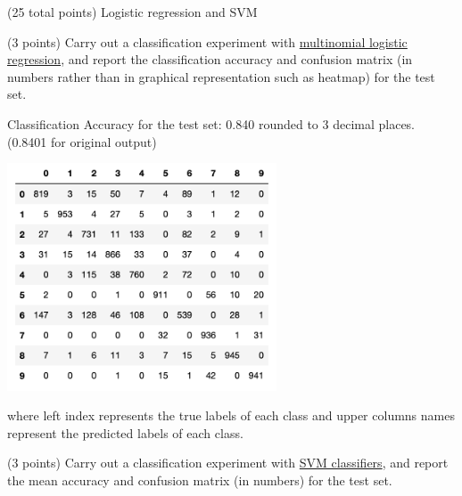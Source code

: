 \documentclass[12pt]{article}
\begin{document}
\begin{question}{(25 total points) Logistic regression and SVM}

  


  \medskip
   \begin{subquestion}{(3 points)
       Carry out a classification experiment with
       \href{https://scikit-learn.org/0.19/modules/generated/sklearn.linear\_model.LogisticRegression.html}{multinomial logistic regression},
       and report the classification accuracy and confusion matrix (in
       numbers rather than in graphical representation such as heatmap)
       for the test set.
     } \label{Q2.1}


   

      \begin{answerbox}{30em}
         Classification Accuracy for the test set: 0.840 rounded to 3 decimal places. \\(0.8401 for original output)
         \begin{center}
         \includegraphics[width=0.6\textwidth]{logistic.png}
         \end{center}
         where left index represents the true labels of each class and upper columns names represent the predicted labels of each class.
      \end{answerbox}
  


   \end{subquestion}
   \begin{subquestion}{(3 points)
       Carry out a classification experiment with
       \href{https://scikit-learn.org/0.19/modules/generated/sklearn.svm.SVC.html}{SVM classifiers}, and report the
       mean accuracy and confusion matrix (in numbers) for the test
       set.
     } \label{Q2.2}



\end{subquestion}
\end{question}
\end{document}
